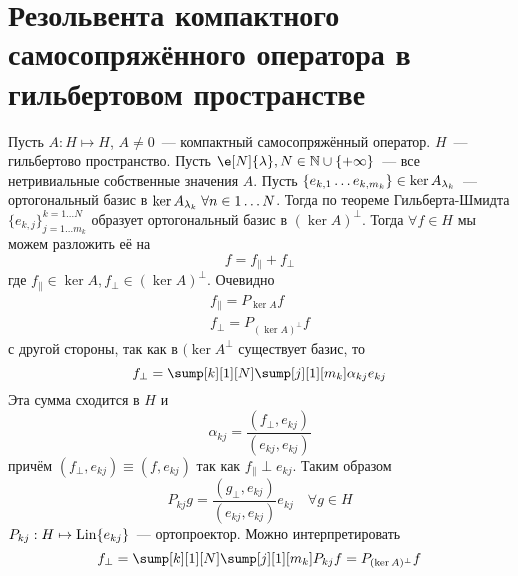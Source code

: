 \documentclass[14pt]{extarticle}
\begin{document}
\section*{Резольвента компактного самосопряжённого оператора в 
гильбертовом пространстве}
Пусть $A : H \mapsto H$, $A \neq 0$~--- компактный самосопряжённый оператор.
$H$~--- гильбертово пространство.
Пусть $\e[N]{\lambda}, N \in \mathbb N \cup \{+\infty\}$~--- все нетривиальные
собственные значения $A$.
Пусть $\{e_{k,1}\dots e_{k,m_k}\} \in \ker \Al[k]$~--- ортогональный базис в 
$\ker \Al[k]\; \forall n \in 1\dots N$.
Тогда по теореме Гильберта-Шмидта $\{e_{k,j}\}_{j = 1\dots m_k}^{k = 1 \dots N}$
образует ортогональный базис в $(\ker A)^\perp$.
Тогда $\forall f \in H$ мы можем разложить её на
$$
f = f_\parallel + f_\perp
$$
где $f_\parallel \in \ker A, f_\perp \in (\ker A)^\perp$.
Очевидно
\begin{gather*}
    f_\parallel = P_{\ker A}f\\
    f_\perp = P_{(\ker A)^\perp} f
\end{gather*}
с другой стороны, так как в  $(\ker A^\perp$ существует базис, то
$$
f_\perp = \sump[k][1][N] \sump[j][1][m_k] \alpha_{kj} e_{kj}
$$
Эта сумма сходится в $H$ и 
$$
\alpha_{kj} = \dfrac{(f_\perp, e_{kj})}{(e_{kj}, e_{kj})}
$$
причём $(f_\perp, e_{kj}) \equiv (f, e_{kj})$ так как $f_\parallel \perp e_{kj}$.
Таким образом
$$
P_{kj}g = \dfrac{(g_\perp, e_{kj})}{(e_{kj}, e_{kj})} e_{kj} \quad \forall g \in H
$$
$P_{kj} : H \mapsto \operatorname{Lin}\{e_{kj}\}$~--- ортопроектор.
Можно интерпретировать
$$
f_\perp = \sump[k][1][N] \sump[j][1][m_k] P_{kj} f = P_{(\ker A)^\perp}f 
$$
\end{document}
